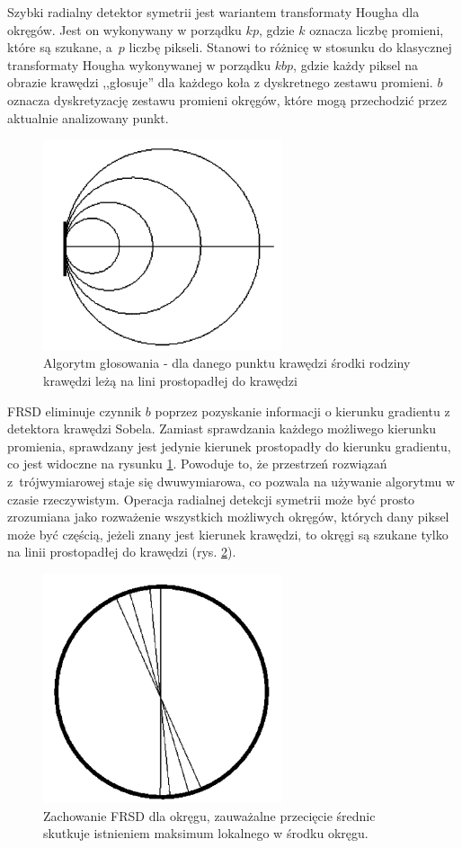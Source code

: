Szybki radialny detektor symetrii jest wariantem transformaty Hougha dla okręgów. 
Jest on wykonywany w porządku $kp$, gdzie $k$ oznacza liczbę promieni, które są szukane, a~$p$ liczbę pikseli. Stanowi to różnicę w stosunku do klasycznej transformaty Hougha wykonywanej w porządku $kbp$, gdzie każdy piksel na obrazie krawędzi ,,głosuje'' dla każdego koła z dyskretnego zestawu promieni. $b$ oznacza dyskretyzację zestawu promieni okręgów, które mogą przechodzić przez aktualnie analizowany punkt.

\begin{figure}
  \centering
  \includegraphics[width=7cm]{img/fsrd1.png}
  \caption{Algorytm głosowania - dla danego punktu krawędzi środki rodziny krawędzi leżą na lini prostopadłej do krawędzi\cite{T2}}
  \label{fig:frsd1}
\end{figure}

FRSD eliminuje czynnik $b$ poprzez pozyskanie informacji o kierunku gradientu z detektora krawędzi Sobela.
Zamiast sprawdzania każdego możliwego kierunku promienia, sprawdzany jest jedynie kierunek prostopadły do kierunku gradientu, co jest widoczne na rysunku \ref{fig:frsd1}. 
Powoduje to, że przestrzeń rozwiązań z~trójwymiarowej staje się dwuwymiarowa, co pozwala na używanie algorytmu w czasie rzeczywistym. 
Operacja radialnej detekcji symetrii może być prosto zrozumiana jako rozważenie wszystkich możliwych okręgów, których dany piksel może być częścią, jeżeli znany jest kierunek krawędzi, to okręgi są szukane tylko na linii prostopadłej do krawędzi (rys. \ref{fig:frsd2}). %

\begin{figure}
  \centering
  \includegraphics[width=7cm]{img/fsrd2.png}
  \caption{Zachowanie FRSD dla okręgu, zauważalne przecięcie średnic skutkuje istnieniem maksimum lokalnego w środku okręgu.\cite{T2}} %
  \label{fig:frsd2}
\end{figure}

